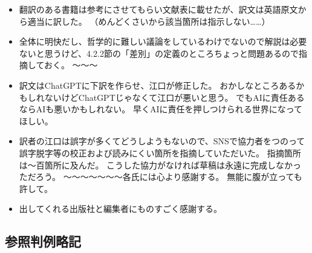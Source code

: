 \documentclass[paper=a4,book,openany]{jlreq}
\begin{document}
\begin{itemize}
\item 翻訳のある書籍は参考にさせてもらい文献表に載せたが、訳文は英語原文から適当に訳した。
（めんどくさいから該当箇所は指示しない……）

\item 全体に明快だし、哲学的に難しい議論をしているわけでないので解説は必要ないと思うけど、4.2.2節の「差別」の定義のところちょっと問題あるので指摘しておく。
〜〜〜

\item 訳文はChatGPTに下訳を作らせ、江口が修正した。
おかしなところあるかもしれないけどChatGPTじゃなくて江口が悪いと思う。
でもAIに責任あるならAIも悪いかもしれない。
早くAIに責任を押しつけられる世界になってほしい。
\item 訳者の江口は誤字が多くてどうしようもないので、SNSで協力者をつのって誤字脱字等の校正および読みにくい箇所を指摘していただいた。
指摘箇所は〜百箇所に及んだ。
こうした協力がなければ草稿は永遠に完成しなかっただろう。
〜〜〜〜〜〜〜各氏には心より感謝する。
無能に腹が立っても許して。
\item 出してくれる出版社と編集者にものすごく感謝する。
\end{itemize}


{\footnotesize
{}
{}

  
}

\subsection*{参照判例略記}
\end{document}
